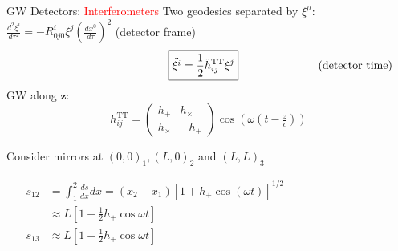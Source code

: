 \documentclass[xcolor=dvipsnames,handout,t]{beamer}
\newcommand{\todo}[1]{\textcolor{orange}{\texttt{TODO: #1}}}
\newcommand{\red}[1]{\textcolor{red}{#1}}
\begin{document}
 \begin{frame}{GW Detectors: \red{Interferometers}}
    Two geodesics separated by $\xi^\mu$:
    $ \tfrac{d^2 \xi^i}{d\tau^2} = -R^i_{0j0} \xi^j\left(\tfrac{dx^0}{d\tau}\right)^2$ \hfill (detector frame)\\
    \vspace{-3mm}
    \[
    \hspace{4.5cm} \boxed{\ddot{\xi^i} = \frac{1}{2} \ddot{h}_{ij}^\text{TT} \xi^j} \hspace{2.5cm} \text{(detector time)}
    \]
    {
      GW along $\mathbf{z}$: 
      \[
      h_{ij}^\text{TT} = \left(\begin{array}{cc}
				h_+ & h_\times \\
				h_\times & - h_+
				\end{array}\right) \cos\left(\omega\left( t-\tfrac{z}{c}\right)\right)
      \]
    }
    {
      Consider mirrors at $(0,0)_1, (L,0)_2$ and $(L,L)_3$
      \begin{small}
      \begin{align*}
	s_{12} &= \int_1^2 \tfrac{ds}{dx}dx = (x_2-x_1) \left[ 1 + h_+ \cos(\omega t)\right]^{1/2}\hspace{4cm} \\
				    & \approx L \left[ 1+\tfrac{1}{2} h_+ \cos\omega t \right] \\
      s_{13} &\approx L \left[ 1-\tfrac{1}{2} h_+ \cos\omega t \right]
      \end{align*}
      \end{small}
    }
    {
    }
 \end{frame}
 
 
\end{document}
